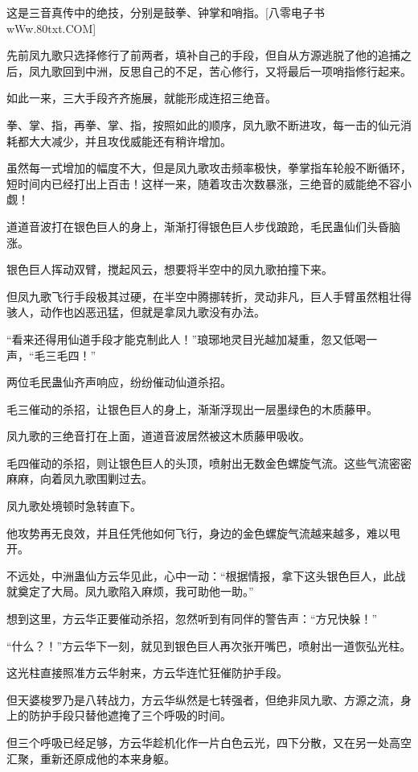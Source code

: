 \begin{this_body}
这是三音真传中的绝技，分别是鼓拳、钟掌和哨指。[八零电子书wWw.80txt.COM]

先前凤九歌只选择修行了前两者，填补自己的手段，但自从方源逃脱了他的追捕之后，凤九歌回到中洲，反思自己的不足，苦心修行，又将最后一项哨指修行起来。

如此一来，三大手段齐齐施展，就能形成连招三绝音。

拳、掌、指，再拳、掌、指，按照如此的顺序，凤九歌不断进攻，每一击的仙元消耗都大大减少，并且攻伐威能还有稍许增加。

虽然每一式增加的幅度不大，但是凤九歌攻击频率极快，拳掌指车轮般不断循环，短时间内已经打出上百击！这样一来，随着攻击次数暴涨，三绝音的威能绝不容小觑！

道道音波打在银色巨人的身上，渐渐打得银色巨人步伐踉跄，毛民蛊仙们头昏脑涨。

银色巨人挥动双臂，搅起风云，想要将半空中的凤九歌拍撞下来。

但凤九歌飞行手段极其过硬，在半空中腾挪转折，灵动非凡，巨人手臂虽然粗壮得骇人，动作也凶恶迅猛，但就是拿凤九歌没有办法。

“看来还得用仙道手段才能克制此人！”琅琊地灵目光越加凝重，忽又低喝一声，“毛三毛四！”

两位毛民蛊仙齐声响应，纷纷催动仙道杀招。

毛三催动的杀招，让银色巨人的身上，渐渐浮现出一层墨绿色的木质藤甲。

凤九歌的三绝音打在上面，道道音波居然被这木质藤甲吸收。

毛四催动的杀招，则让银色巨人的头顶，喷射出无数金色螺旋气流。这些气流密密麻麻，向着凤九歌围剿过去。

凤九歌处境顿时急转直下。

他攻势再无良效，并且任凭他如何飞行，身边的金色螺旋气流越来越多，难以甩开。

不远处，中洲蛊仙方云华见此，心中一动：“根据情报，拿下这头银色巨人，此战就奠定了大局。凤九歌陷入麻烦，我可助他一助。”

想到这里，方云华正要催动杀招，忽然听到有同伴的警告声：“方兄快躲！”

“什么？！”方云华下一刻，就见到银色巨人再次张开嘴巴，喷射出一道恢弘光柱。

这光柱直接照准方云华射来，方云华连忙狂催防护手段。

但天婆梭罗乃是八转战力，方云华纵然是七转强者，但绝非凤九歌、方源之流，身上的防护手段只替他遮掩了三个呼吸的时间。

但三个呼吸已经足够，方云华趁机化作一片白色云光，四下分散，又在另一处高空汇聚，重新还原成他的本来身躯。


\end{this_body}
